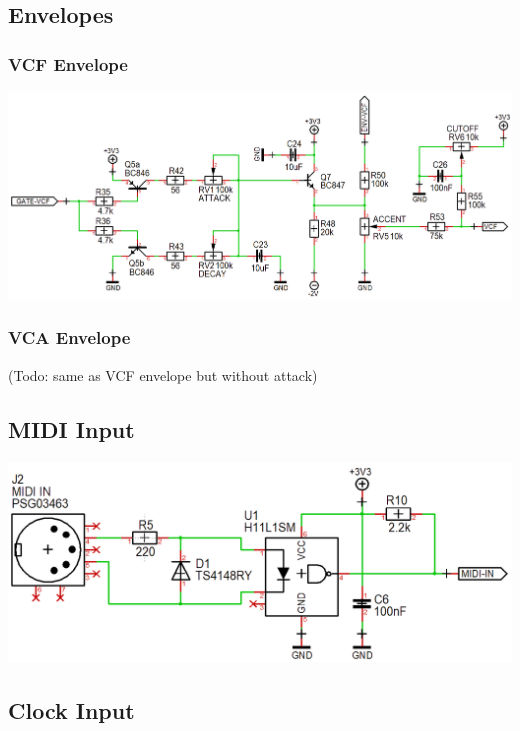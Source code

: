 \documentclass{scrartcl}
\begin{document}
\subsection{Envelopes}

\subsubsection{VCF Envelope}

\begin{center}
    \includegraphics[scale=0.36]{assets/schema-ar.png}
\end{center}

\subsubsection{VCA Envelope}

(Todo: same as VCF envelope but without attack)

\subsection{MIDI Input}

\begin{center}
    \includegraphics[scale=0.40]{assets/schema-midi.png}
\end{center}

\subsection{Clock Input}
\end{document}
